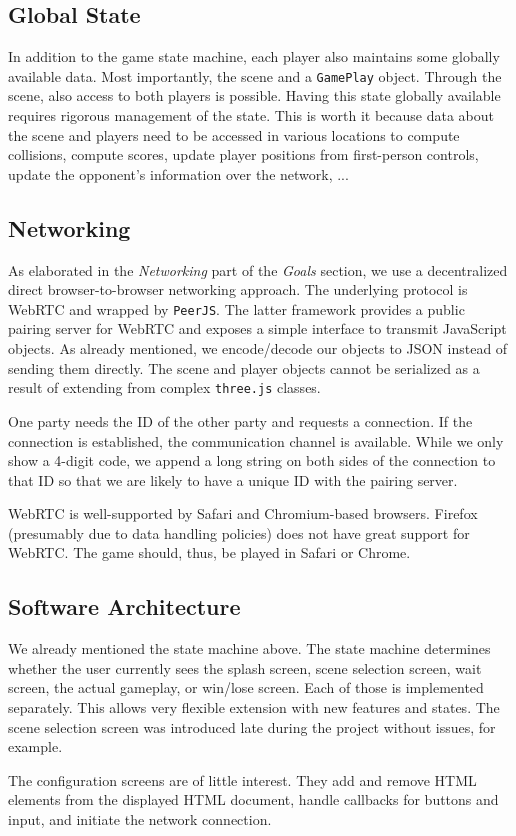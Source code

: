\documentclass[11pt]{article}
\begin{document}
\subsection{Global State}
\par In addition to the game state machine, each player also maintains some globally available data. Most importantly, the scene and a \texttt{GamePlay} object. Through the scene, also access to both players is possible. Having this state globally available requires rigorous management of the state. This is worth it because data about the scene and players need to be accessed in various locations to compute collisions, compute scores, update player positions from first-person controls, update the opponent's information over the network, ...

\subsection{Networking}
\par As elaborated in the \textit{Networking} part of the \textit{Goals} section, we use a decentralized direct browser-to-browser networking approach. The underlying protocol is WebRTC and wrapped by \texttt{PeerJS}. The latter framework provides a public pairing server for WebRTC and exposes a simple interface to transmit JavaScript objects. As already mentioned, we encode/decode our objects to JSON instead of sending them directly. The scene and player objects cannot be serialized as a result of extending from complex \texttt{three.js} classes.
\par One party needs the ID of the other party and requests a connection. If the connection is established, the communication channel is available. While we only show a 4-digit code, we append a long string on both sides of the connection to that ID so that we are likely to have a unique ID with the pairing server.
\par WebRTC is well-supported by Safari and Chromium-based browsers. Firefox (presumably due to data handling policies) does not have great support for WebRTC. The game should, thus, be played in Safari or Chrome.

\subsection{Software Architecture}
\par We already mentioned the state machine above. The state machine determines whether the user currently sees the splash screen, scene selection screen, wait screen, the actual gameplay, or win/lose screen. Each of those is implemented separately. This allows very flexible extension with new features and states. The scene selection screen was introduced late during the project without issues, for example.
\par The configuration screens are of little interest. They add and remove HTML elements from the displayed HTML document, handle callbacks for buttons and input, and initiate the network connection.
\end{document}
